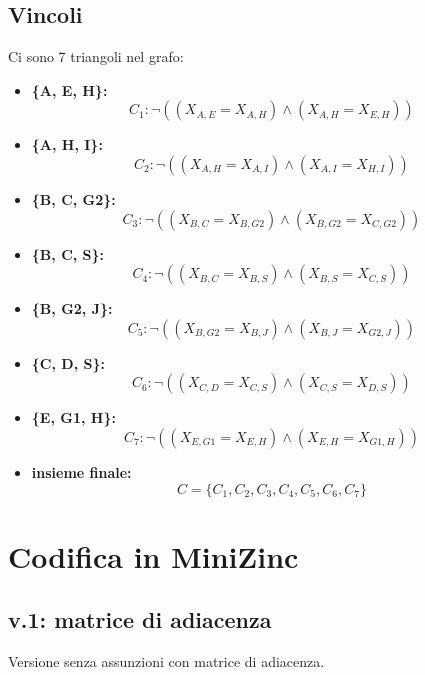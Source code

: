 \documentclass[12pt]{article}
\begin{document}
\subsection{Vincoli}
Ci sono 7 triangoli nel grafo:

\begin{itemize}
\item \textbf{\{A, E, H\}:}
        \[ C_1: \neg ((X_{A,E} = X_{A,H}) \land (X_{A,H} = X_{E,H})) \]

    \item \textbf{\{A, H, I\}:}
        \[ C_2: \neg ((X_{A,H} = X_{A,I}) \land (X_{A,I} = X_{H,I})) \]

    \item \textbf{\{B, C, G2\}:}
        \[ C_3: \neg ((X_{B,C} = X_{B,G2}) \land (X_{B,G2} = X_{C,G2})) \]

    \item \textbf{\{B, C, S\}:}
        \[ C_4: \neg ((X_{B,C} = X_{B,S}) \land (X_{B,S} = X_{C,S})) \]

    \item \textbf{\{B, G2, J\}:}
        \[ C_5: \neg ((X_{B,G2} = X_{B,J}) \land (X_{B,J} = X_{G2,J})) \]

    \item \textbf{\{C, D, S\}:}
        \[ C_6: \neg ((X_{C,D} = X_{C,S}) \land (X_{C,S} = X_{D,S})) \]

    \item \textbf{\{E, G1, H\}:}
        \[ C_7: \neg ((X_{E,G1} = X_{E,H}) \land (X_{E,H} = X_{G1,H})) \]
    \item \textbf{insieme finale:}
        \[
            C = \{ C_1, C_2, C_3, C_4, C_5, C_6, C_7 \}
        \]

\end{itemize}

\section{Codifica in MiniZinc}

\subsection{v.1: matrice di adiacenza}
Versione senza assunzioni con matrice di adiacenza.
\end{document}
